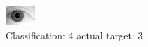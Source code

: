 \begin{figure}[h!]
\begin{center}
\includegraphics[width=0.60\columnwidth]{figures/ID2201_class_4_target_3.png}
\end{center}
\caption{ Classification: 4 actual target: 3}
\label{fig:ID2201_class_4_target_3}
\end{figure}

